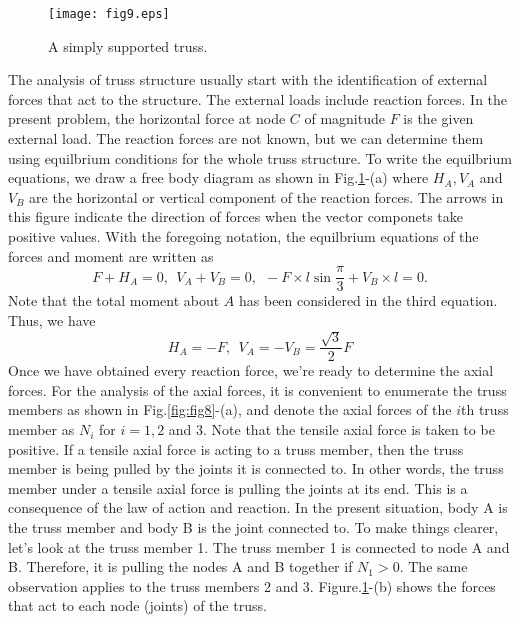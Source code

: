 \documentclass[10pt,a4j]{article}
\begin{document}
\begin{figure}[h]
	\begin{center}
	\texttt{[image: fig9.eps]} 
	\end{center}
	\caption{A simply supported truss.} 
	\label{fig:fig9}
\end{figure}
The analysis of truss structure usually start with the identification of 
external forces that act to the structure. 
The external loads include reaction forces.  
In the present problem, the horizontal force at node $C$ of magnitude $F$ 
is the given external load.
The reaction forces are not known, but we can determine them using 
equilbrium conditions for the whole truss structure. To write the 
equilbrium equations, we draw a free body diagram as shown in Fig.\ref{fig:fig9}-(a)
where $H_A, V_A$ and $V_B$ are the horizontal or vertical component 
of the reaction forces. The arrows in this figure indicate the direction of 
forces when the vector componets take positive values. 
With the foregoing notation, the equilbrium equations of the forces 
and moment are written as
\begin{equation}
	F+H_A=0, \ \ V_A+V_B=0, \ \ -F\times l\sin\frac{\pi}{3}+V_B\times l=0.
	\label{eqn:}
\end{equation}
Note that the total moment about $A$ has been considered in the third equation.
Thus, we have 
\begin{equation}
	H_A=-F, \ \ V_A=-V_B=\frac{\sqrt{3}}{2}F
	\label{eqn:}
\end{equation}
Once we have obtained every reaction force, we're ready to determine the axial forces. 
For the analysis of the axial forces, it is convenient to enumerate the truss members as 
shown in Fig.\ref{fig:fig8}-(a), and denote the axial forces of the $i$th truss member 
as $N_i$ for $i=1,2$ and 3. Note that the tensile axial force is taken to be positive. 
If a tensile axial force is acting to a truss member, then the truss member is 
being pulled by the joints it is connected to. 
In other words, the truss member under a tensile axial force is pulling 
the joints at its end. This is a consequence of the law of action and reaction.
In the present situation, body A is the truss member and body B is the joint connected to.
To make things clearer, let's look at the truss member 1. The truss member 1 is connected 
to node A and B. Therefore, it is pulling the nodes A and B together if $N_1>0$. 
The same observation applies to the truss members 2 and 3. 
Figure.\ref{fig:fig9}-(b) shows the forces that act to each node (joints) of the truss. 
\end{document}
